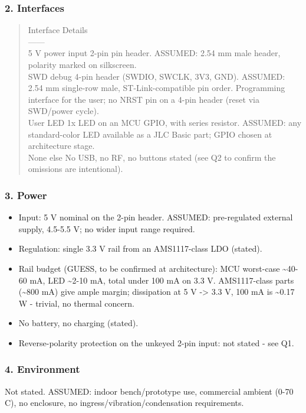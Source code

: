 \documentclass[11pt,a4paper]{article}
\begin{document}
\subsubsection*{2. Interfaces}
\begin{quote}\small\ttfamily\raggedright
\textbar{} Interface \textbar{} Details \textbar{}\\
\textbar{}---\textbar{}---\textbar{}\\
\textbar{} 5 V power input \textbar{} 2-pin pin header. ASSUMED: 2.54 mm male header, polarity marked on silkscreen. \textbar{}\\
\textbar{} SWD debug \textbar{} 4-pin header (SWDIO, SWCLK, 3V3, GND). ASSUMED: 2.54 mm single-row male, ST-Link-compatible pin order. Programming interface for the user; no NRST pin on a 4-pin header (reset via SWD/power cycle). \textbar{}\\
\textbar{} User LED \textbar{} 1x LED on an MCU GPIO, with series resistor. ASSUMED: any standard-color LED available as a JLC Basic part; GPIO chosen at architecture stage. \textbar{}\\
\textbar{} None else \textbar{} No USB, no RF, no buttons stated (see Q2 to confirm the omissions are intentional). \textbar{}
\end{quote}
\subsubsection*{3. Power}
\begin{itemize}
\item Input: 5 V nominal on the 2-pin header. ASSUMED: pre-regulated external
supply, 4.5-5.5 V; no wider input range required.
\item Regulation: single 3.3 V rail from an AMS1117-class LDO (stated).
\item Rail budget (GUESS, to be confirmed at architecture): MCU worst-case
\textasciitilde{}40-60 mA, LED \textasciitilde{}2-10 mA, total under 100 mA on 3.3 V. AMS1117-class parts
(\textasciitilde{}800 mA) give ample margin; dissipation at 5 V -\textgreater{} 3.3 V, 100 mA is
\textasciitilde{}0.17 W - trivial, no thermal concern.
\item No battery, no charging (stated).
\item Reverse-polarity protection on the unkeyed 2-pin input: not stated - see Q1.
\end{itemize}
\subsubsection*{4. Environment}
Not stated. ASSUMED: indoor bench/prototype use, commercial ambient (0-70 C), no enclosure, no ingress/vibration/condensation requirements.
\end{document}
